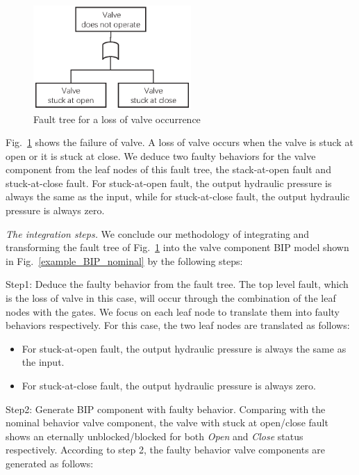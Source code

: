 \begin{figure}[htbp]
	\centerline{\includegraphics[width=60mm]{figure/example_fault_tree.eps}}
	\caption{Fault tree for a loss of valve occurrence}
	\label{example_valve_fault_tree}
\end{figure}

Fig.~\ref{example_valve_fault_tree} shows the failure of valve. A loss of valve occurs when the valve is stuck at open or it is stuck at close. We deduce two faulty behaviors for the valve component from the leaf nodes of this fault tree, the stack-at-open fault and stuck-at-close fault. For stuck-at-open fault, the output hydraulic pressure is always the same as the input, while for stuck-at-close fault, the output hydraulic pressure is always zero.

\emph{The integration steps.} We conclude our methodology of integrating and transforming the fault tree of Fig.~\ref{example_valve_fault_tree} into the valve component BIP model shown in Fig.~\ref{example_BIP_nominal} by the following steps:

Step1: Deduce the faulty behavior from the fault tree. The top level fault, which is the loss of valve in this case, will occur through the combination of the leaf nodes with the gates. We focus on each leaf node to translate them into faulty behaviors respectively. For this case, the two leaf nodes are translated as follows:

\begin{itemize}
	\item For stuck-at-open fault, the output hydraulic pressure is always the same as the input.
	\item For stuck-at-close fault, the output hydraulic pressure is always zero.
\end{itemize}

Step2: Generate BIP component with faulty behavior. Comparing with the nominal behavior valve component, the valve with stuck at open/close fault shows an eternally unblocked/blocked for both \emph{Open} and \emph{Close} status respectively. According to step 2, the faulty behavior valve components are generated as follows:

